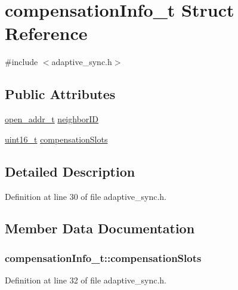\hypertarget{structcompensation_info__t}{}\section{compensation\+Info\+\_\+t Struct Reference}
\label{structcompensation_info__t}


{\ttfamily \#include $<$adaptive\+\_\+sync.\+h$>$}

\subsection*{Public Attributes}
\begin{DoxyCompactItemize}
\item 
\hyperlink{structopen__addr__t}{open\+\_\+addr\+\_\+t} \hyperlink{structcompensation_info__t_a1eb136216bfe65b6708aec6953ca21a3}{neighbor\+ID}
\item 
\hyperlink{_p_e___types_8h_a1f1825b69244eb3ad2c7165ddc99c956}{uint16\+\_\+t} \hyperlink{structcompensation_info__t_a1fe6c04b047a9fcdbdf4acb952dc7a7a}{compensation\+Slots}
\end{DoxyCompactItemize}


\subsection{Detailed Description}


Definition at line 30 of file adaptive\+\_\+sync.\+h.



\subsection{Member Data Documentation}
\subsubsection[{\texorpdfstring{compensation\+Slots}{compensationSlots}}]{ compensation\+Info\+\_\+t\+::compensation\+Slots}\hypertarget{structcompensation_info__t_a1fe6c04b047a9fcdbdf4acb952dc7a7a}{}\label{structcompensation_info__t_a1fe6c04b047a9fcdbdf4acb952dc7a7a}


Definition at line 32 of file adaptive\+\_\+sync.\+h.

